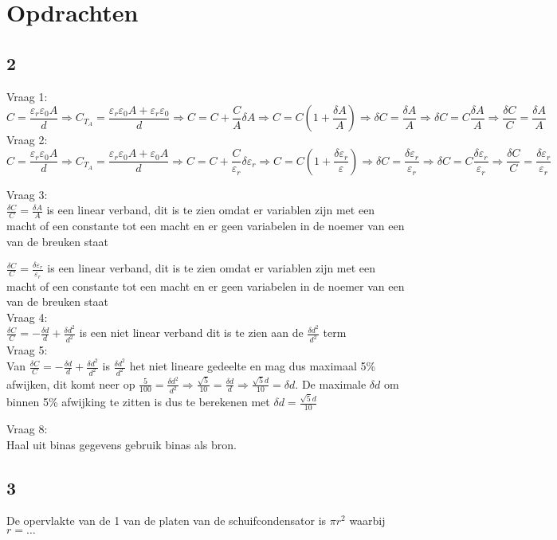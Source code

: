 \section{Opdrachten}
\subsection{2}
    Vraag 1:\\
    \begin{equation} \label{eq:a}
        C=\frac{\varepsilon_r\varepsilon_0A}{d}\Rightarrow C_{T_A}=\frac{\varepsilon_r \varepsilon_0A + \varepsilon_r \varepsilon_0}{d} \Rightarrow C = C + \frac{C}{A}\delta A \Rightarrow C=C(1+\frac{\delta A}{A}) \Rightarrow \delta C=\frac{\delta A}{A} \Rightarrow \delta C = C\frac{\delta A}{A}\Rightarrow \frac{\delta C}{C}=\frac{\delta A}{A}
    \end{equation}
    Vraag 2:\\
    \begin{equation} \label{eq:epsilonR}
        C=\frac{\varepsilon_r\varepsilon_0A}{d}\Rightarrow C_{T_A}=\frac{\varepsilon_r \varepsilon_0A + \varepsilon_0A}{d} \Rightarrow C = C + \frac{C}{\varepsilon_r}\delta\varepsilon_r \Rightarrow C=C(1+\frac{\delta \varepsilon_r}{\varepsilon}) \Rightarrow \delta C=\frac{\delta \varepsilon_r}{\varepsilon_r} \Rightarrow \delta C = C\frac{\delta \varepsilon_r}{\varepsilon_r}\Rightarrow \frac{\delta C}{C}=\frac{\delta \varepsilon_r}{\varepsilon_r}
    \end{equation}

    \noindent
    Vraag 3:\\
    $\frac{\delta C}{C}=\frac{\delta A}{A}$ is een linear verband, dit is te zien omdat er variablen zijn met een macht of een constante tot een macht en er geen variabelen in de noemer van een van de breuken staat

    \noindent
    $\frac{\delta C}{C}=\frac{\delta \varepsilon_r}{\varepsilon_r}$ is een linear verband, dit is te zien omdat er variablen zijn met een macht of een constante tot een macht en er geen variabelen in de noemer van een van de breuken staat\\

    \noindent
    Vraag 4:\\
    $\frac{\delta C}{C}=-\frac{\delta d}{d}+\frac{\delta d^2}{d^2}$ is een niet linear verband dit is te zien aan de $\frac{\delta d^2}{d^2}$ term\\

    \noindent
    Vraag 5:\\
    Van $\frac{\delta C}{C}=-\frac{\delta d}{d}+\frac{\delta d^2}{d^2}$ is $\frac{\delta d^2}{d^2}$ het niet lineare gedeelte
    en mag dus maximaal 5\% afwijken, dit komt neer op $\frac{5}{100}=\frac{\delta d^2}{d^2}\Rightarrow\frac{\sqrt{5}}{10}=\frac{\delta d}{d}\Rightarrow \frac{\sqrt{5}d}{10}=\delta d$. De maximale 
    $\delta d$ om binnen 5\% afwijking te zitten is dus te berekenen met $\delta d=\frac{\sqrt{5}d}{10}$

    \noindent
    Vraag 8:\\
    Haal uit binas gegevens gebruik binas als bron.

\subsection{3}
De opervlakte van de 1 van de platen van de schuifcondensator is 
$\pi r^2$ waarbij $r=\dots$